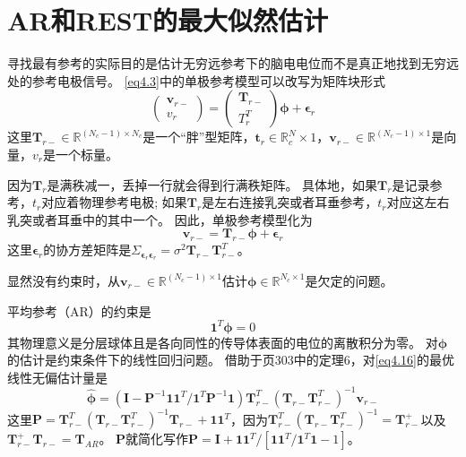 \section{AR和REST的最大似然估计}
寻找最有参考的实际目的是估计无穷远参考下的脑电电位而不是真正地找到无穷远处的参考电极信号。 \eqref{eq4.3}中的单极参考模型可以改写为矩阵块形式
\begin{equation}\label{eq4.15}
\begin{pmatrix}\mathbf{v}_{r-}\\v_r\end{pmatrix}=\begin{pmatrix}\mathbf{T}_{r-}\\T_r^T\end{pmatrix}\mathbf{\phi}+\mathbf{\epsilon}_r
\end{equation}
这里$\mathbf{T}_{r-}\in\mathbb{R}^{(N_c-1)\times{N_c}}$是一个“胖”型矩阵，$\mathbf{t}_r\in\mathbb{R}^N_c\times1$，$\mathbf{v}_{r-}\in\mathbb{R}^{(N_c-1)\times1}$是向量，$v_r$是一个标量。

因为$\mathbf{T}_r$是满秩减一，丢掉一行就会得到行满秩矩阵。 具体地，如果$\mathbf{T}_r$是记录参考，$t_r$对应着物理参考电极; 如果$\mathbf{T}_r$是左右连接乳突或者耳垂参考，$t_r$对应这左右乳突或者耳垂中的其中一个。 因此，单极参考模型化为
\begin{equation}\label{eq4.16}
\mathbf{v}_{r-}=\mathbf{T}_{r-}\mathbf{\phi}+\mathbf{\epsilon}_r
\end{equation}
这里$\mathbf{\epsilon}_r$的协方差矩阵是$\Sigma_{\mathbf{\epsilon}_r\mathbf{\epsilon}_r}=\sigma^2\mathbf{T}_{r-}\mathbf{T}_{r-}^T$。

显然没有约束时，从$\mathbf{v}_{r-}\in\mathbb{R}^{(N_c-1)\times1}$估计$\mathbf{\phi}\in\mathbb{R}^{N_c\times1}$是欠定的问题。

平均参考（AR）的约束是
\begin{equation}\label{eq4.17}
\mathbf{1}^T\mathbf{\phi}=0
\end{equation}
其物理意义是分层球体且是各向同性的传导体表面的电位的离散积分为零。 对$\mathbf{\phi}$的估计是约束条件下的线性回归问题。 借助于\cite{magnus_matrix_2007}页303中的定理6，对\eqref{eq4.16}的最优线性无偏估计量是
\begin{equation}\label{eq4.18}
\hat{\mathbf{\phi}}=(\mathbf{I}-\mathbf{P}^{-1}\mathbf{11}^T/{\mathbf{1}^T\mathbf{P}^{-1}\mathbf{1}})\mathbf{T}_{r-}^T(\mathbf{T}_{r-}\mathbf{T}_{r-}^T)^{-1}\mathbf{v}_{r-}
\end{equation}
这里$\mathbf{P}={\mathbf{T}_{r-}^T(\mathbf{T}_{r-}\mathbf{T}_{r-}^T)^{-1}\mathbf{T}_{r-}}+\mathbf{11}^T$，因为$\mathbf{T}_{r-}^T(\mathbf{T}_{r-}\mathbf{T}_{r-}^T)^{-1}=\mathbf{T}_{r-}^+$以及$\mathbf{T}_{r-}^+\mathbf{T}_{r-}=\mathbf{T}_{AR}$。 $\mathbf{P}$就简化写作$\mathbf{P}=\mathbf{I}+\mathbf{11}^T/{[\mathbf{11}^T/{\mathbf{1}^T\mathbf{1}-1}]}$。


